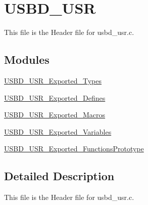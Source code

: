 \hypertarget{group___u_s_b_d___u_s_r}{\section{U\-S\-B\-D\-\_\-\-U\-S\-R}
\label{group___u_s_b_d___u_s_r}
}


This file is the Header file for usbd\-\_\-usr.\-c.  


\subsection*{Modules}
\begin{DoxyCompactItemize}
\item 
\hyperlink{group___u_s_b_d___u_s_r___exported___types}{U\-S\-B\-D\-\_\-\-U\-S\-R\-\_\-\-Exported\-\_\-\-Types}
\item 
\hyperlink{group___u_s_b_d___u_s_r___exported___defines}{U\-S\-B\-D\-\_\-\-U\-S\-R\-\_\-\-Exported\-\_\-\-Defines}
\item 
\hyperlink{group___u_s_b_d___u_s_r___exported___macros}{U\-S\-B\-D\-\_\-\-U\-S\-R\-\_\-\-Exported\-\_\-\-Macros}
\item 
\hyperlink{group___u_s_b_d___u_s_r___exported___variables}{U\-S\-B\-D\-\_\-\-U\-S\-R\-\_\-\-Exported\-\_\-\-Variables}
\item 
\hyperlink{group___u_s_b_d___u_s_r___exported___functions_prototype}{U\-S\-B\-D\-\_\-\-U\-S\-R\-\_\-\-Exported\-\_\-\-Functions\-Prototype}
\end{DoxyCompactItemize}


\subsection{Detailed Description}
This file is the Header file for usbd\-\_\-usr.\-c. 